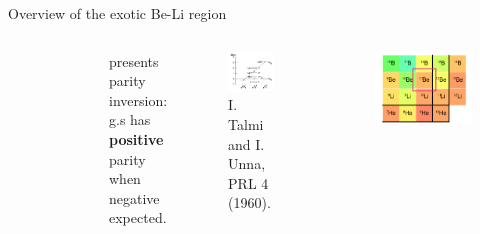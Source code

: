 \documentclass[sans,
frameno, %
mp,
usenames,dvipsnames, %
onlytextwidth, %
t,%
11pt]{beamer}
\newcommand{\notice}[1]{\textbf{\alert{#1}}}
\newcommand{\iso}[2]{\ce{^{#1}#2}}
\begin{document}
\begin{frame}[t]{Overview of the exotic Be-Li region}
\begin{columns}[c]
{{\begin{figure}
                \end{figure}
            }
        }
        \only<+>
        {
            \addtocounter{framenumber}{1}
            {
                \notice{\iso{11}{Be}} presents parity inversion: g.s has \textbf{positive} parity when negative expected.
                \bigskip
                \begin{figure}
                    \centering
                    \includegraphics[width=0.75\linewidth]{figures/11Be_paper.png}
                    \caption{I. Talmi and I. Unna, PRL 4 (1960).}
                \end{figure}
            }
            \hfill
            {
                \begin{figure}
                    \centering
                    \includegraphics[width=0.9\linewidth]{figures/chart_new_11Be.png}
                \end{figure}
            }
        }
    \end{columns}
\end{frame}
\end{document}
